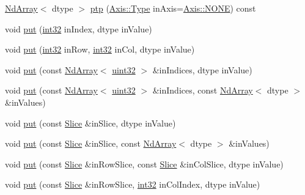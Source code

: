 \begin{DoxyCompactItemize}
\item 
\mbox{\hyperlink{class_num_c_1_1_nd_array}{Nd\+Array}}$<$ dtype $>$ \mbox{\hyperlink{class_num_c_1_1_nd_array_aa591a54d03a0b7e4169a693431cc0900}{ptp}} (\mbox{\hyperlink{struct_num_c_1_1_axis_a8e689044ef1941a03482e730c5e7ebb3}{Axis\+::\+Type}} in\+Axis=\mbox{\hyperlink{struct_num_c_1_1_axis_a8e689044ef1941a03482e730c5e7ebb3a0ae033c4226f7184bf0050b101e7ed94}{Axis\+::\+N\+O\+NE}}) const
\item 
void \mbox{\hyperlink{class_num_c_1_1_nd_array_ac1f5bf7ebbf9b9941e07a72371bf521b}{put}} (\mbox{\hyperlink{namespace_num_c_aa5a7e69266097d55816d4cdb19542b53}{int32}} in\+Index, dtype in\+Value)
\item 
void \mbox{\hyperlink{class_num_c_1_1_nd_array_a37be8fed0a6dd4573377ca5c1e43265c}{put}} (\mbox{\hyperlink{namespace_num_c_aa5a7e69266097d55816d4cdb19542b53}{int32}} in\+Row, \mbox{\hyperlink{namespace_num_c_aa5a7e69266097d55816d4cdb19542b53}{int32}} in\+Col, dtype in\+Value)
\item 
void \mbox{\hyperlink{class_num_c_1_1_nd_array_a35f20063d37b86c903c470f0fa91dae3}{put}} (const \mbox{\hyperlink{class_num_c_1_1_nd_array}{Nd\+Array}}$<$ \mbox{\hyperlink{namespace_num_c_ae685802ca6d3035f2b400b081e3953fa}{uint32}} $>$ \&in\+Indices, dtype in\+Value)
\item 
void \mbox{\hyperlink{class_num_c_1_1_nd_array_a5bd27656a5a052f4f1757881bb8c5117}{put}} (const \mbox{\hyperlink{class_num_c_1_1_nd_array}{Nd\+Array}}$<$ \mbox{\hyperlink{namespace_num_c_ae685802ca6d3035f2b400b081e3953fa}{uint32}} $>$ \&in\+Indices, const \mbox{\hyperlink{class_num_c_1_1_nd_array}{Nd\+Array}}$<$ dtype $>$ \&in\+Values)
\item 
void \mbox{\hyperlink{class_num_c_1_1_nd_array_a50cae04d1e231ad496053c30f99650e0}{put}} (const \mbox{\hyperlink{class_num_c_1_1_slice}{Slice}} \&in\+Slice, dtype in\+Value)
\item 
void \mbox{\hyperlink{class_num_c_1_1_nd_array_aacf22eb97ab4c78b8fd021baf8d0b144}{put}} (const \mbox{\hyperlink{class_num_c_1_1_slice}{Slice}} \&in\+Slice, const \mbox{\hyperlink{class_num_c_1_1_nd_array}{Nd\+Array}}$<$ dtype $>$ \&in\+Values)
\item 
void \mbox{\hyperlink{class_num_c_1_1_nd_array_a96e788a4524cbf562f57a4b7b4c559f7}{put}} (const \mbox{\hyperlink{class_num_c_1_1_slice}{Slice}} \&in\+Row\+Slice, const \mbox{\hyperlink{class_num_c_1_1_slice}{Slice}} \&in\+Col\+Slice, dtype in\+Value)
\item 
void \mbox{\hyperlink{class_num_c_1_1_nd_array_a33006436a1f26df0fc60919444899270}{put}} (const \mbox{\hyperlink{class_num_c_1_1_slice}{Slice}} \&in\+Row\+Slice, \mbox{\hyperlink{namespace_num_c_aa5a7e69266097d55816d4cdb19542b53}{int32}} in\+Col\+Index, dtype in\+Value)

\end{DoxyCompactItemize}
